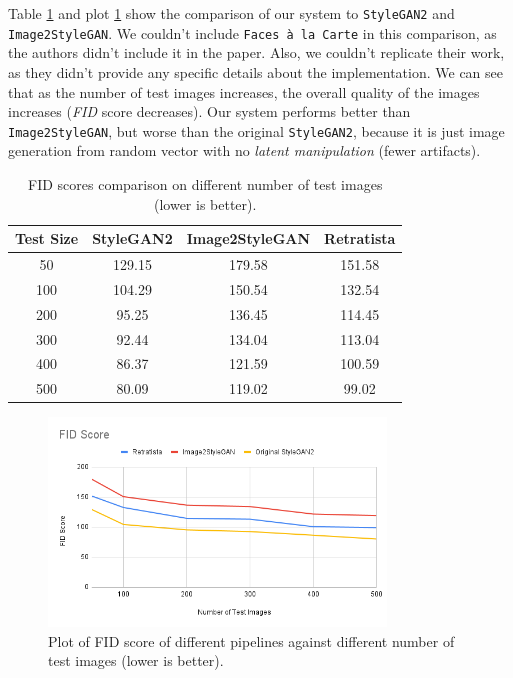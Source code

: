 Table \ref{tab:fid} and plot \ref{fig:fid} show the comparison of our system to \texttt{StyleGAN2} and \texttt{Image2StyleGAN}. We couldn't include \texttt{Faces à la Carte} in this comparison, as the authors didn't include it in the paper. Also, we couldn't replicate their work, as they didn't provide any specific details about the implementation. We can see that as the number of test images increases, the overall quality of the images increases (\emph{FID} score decreases). Our system performs better than \texttt{Image2StyleGAN}, but worse than the original \texttt{StyleGAN2}, because it is just image generation from random vector with no \emph{latent manipulation} (fewer artifacts).

\begin{table}[ht]
\centering
\caption{FID scores comparison on different number of test images (lower is better).}
\begin{tabular}[t]{| c | c | c | c |}
\hline
Test Size & StyleGAN2 & Image2StyleGAN & Retratista \\
\hline \hline
50 & 129.15 & 179.58 & 151.58 \\
\hline
100 & 104.29 & 150.54 & 132.54 \\
\hline
200 & 95.25 & 136.45 & 114.45 \\
\hline
300 & 92.44 & 134.04 & 113.04 \\
\hline
400 & 86.37 & 121.59 & 100.59 \\
\hline
500 & 80.09 & 119.02 & 99.02 \\
\hline
\end{tabular}
\label{tab:fid}
\end{table}

\begin{figure}[H]
    \centering
    \includegraphics[width=0.8\textwidth]{images/fid_score.png}
    \caption{Plot of FID score of different pipelines against different number of test images (lower is better).}
    \label{fig:fid}
\end{figure}


